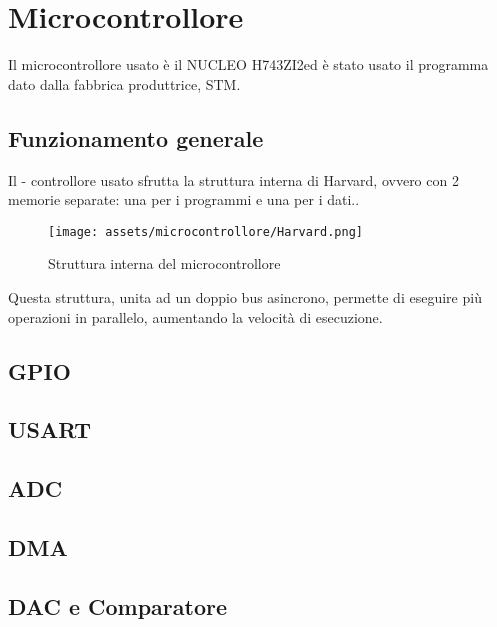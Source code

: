 \pagebreak
\section{Microcontrollore}
Il microcontrollore usato  è il NUCLEO H743ZI2ed è stato usato il programma dato dalla fabbrica produttrice, STM.\\
\subsection{Funzionamento generale}
Il \mu - controllore usato sfrutta la struttura interna di Harvard, ovvero con 2 memorie separate: una per i programmi e una per i dati..\\
\begin{figure}
    \centering
    \texttt{[image: assets/microcontrollore/Harvard.png]}
    \caption{Struttura interna del microcontrollore}
\end{figure}
Questa struttura, unita ad un doppio bus asincrono, permette di eseguire più operazioni in parallelo, aumentando la velocità di esecuzione.


\subsection{GPIO}

\subsection{USART}

\subsection{ADC}

\subsection{DMA}

\subsection{DAC e Comparatore}